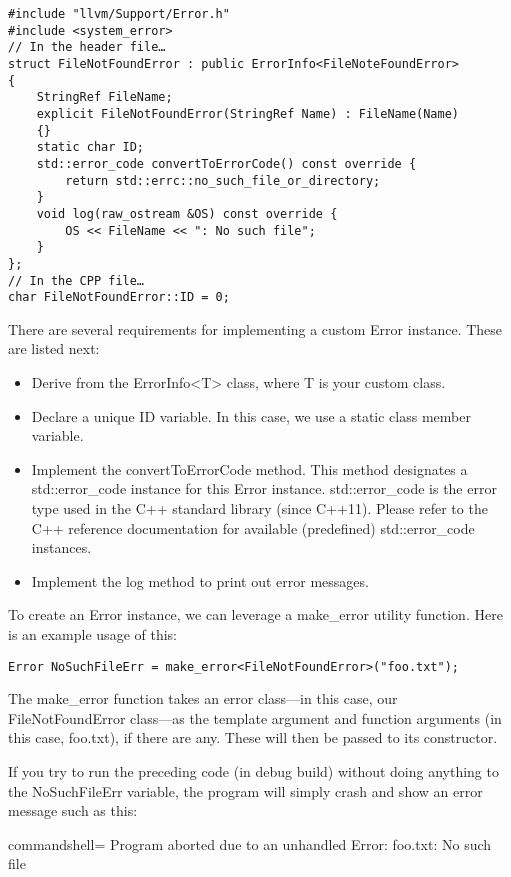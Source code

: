 \begin{lstlisting}[style=styleCXX]
#include "llvm/Support/Error.h"
#include <system_error>
// In the header file…
struct FileNotFoundError : public ErrorInfo<FileNoteFoundError>
{
	StringRef FileName;
	explicit FileNotFoundError(StringRef Name) : FileName(Name)
	{}
	static char ID;
	std::error_code convertToErrorCode() const override {
		return std::errc::no_such_file_or_directory;
	}
	void log(raw_ostream &OS) const override {
		OS << FileName << ": No such file";
	}
};
// In the CPP file…
char FileNotFoundError::ID = 0;
\end{lstlisting}

There are several requirements for implementing a custom Error instance. These are listed next:

\begin{itemize}
\item Derive from the ErrorInfo<T> class, where T is your custom class.
\item Declare a unique ID variable. In this case, we use a static class member variable.
\item Implement the convertToErrorCode method. This method designates a std::error\_code instance for this Error instance. std::error\_code is the error type used in the C++ standard library (since C++11). Please refer to the C++ reference documentation for available (predefined) std::error\_code instances.
\item Implement the log method to print out error messages.
\end{itemize}

To create an Error instance, we can leverage a make\_error utility function. Here is an example usage of this:

\begin{lstlisting}[style=styleCXX]
Error NoSuchFileErr = make_error<FileNotFoundError>("foo.txt");
\end{lstlisting}

The make\_error function takes an error class—in this case, our FileNotFoundError class—as the template argument and function arguments (in this case, foo.txt), if there are any. These will then be passed to its constructor.

If you try to run the preceding code (in debug build) without doing anything to the NoSuchFileErr variable, the program will simply crash and show an error message such as this:

\begin{tcblisting}{commandshell={}}
Program aborted due to an unhandled Error:
foo.txt: No such file
\end{tcblisting}

